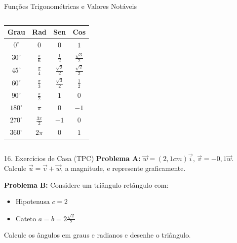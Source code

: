 \documentclass{beamer}
\begin{document}
\begin{frame}{Funções Trigonométricas e Valores Notáveis}
\begin{columns}
		\centering
		\normalsize %
		\renewcommand{\arraystretch}{1.3} %
		\begin{tabular}{|c|c|c|c|}
			\hline
			\textbf{Grau} & \textbf{Rad} & \textbf{Sen} & \textbf{Cos} \\ \hline
			$0^{\circ}$ & $0$ & $0$ & $1$ \\ \hline
			$30^{\circ}$ & $\frac{\pi}{6}$ & $\frac{1}{2}$ & $\frac{\sqrt{3}}{2}$ \\ \hline
			$45^{\circ}$ & $\frac{\pi}{4}$ & $\frac{\sqrt{2}}{2}$ & $\frac{\sqrt{2}}{2}$ \\ \hline
			$60^{\circ}$ & $\frac{\pi}{3}$ & $\frac{\sqrt{3}}{2}$ & $\frac{1}{2}$ \\ \hline
			$90^{\circ}$ & $\frac{\pi}{2}$ & $1$ & $0$ \\ \hline
			$180^{\circ}$ & $\pi$ & $0$ & $-1$ \\ \hline
			$270^{\circ}$ & $\frac{3\pi}{2}$ & $-1$ & $0$ \\ \hline
			$360^{\circ}$ & $2\pi$ & $0$ & $1$ \\ \hline
		\end{tabular}
	\end{columns}
\end{frame}

	
\begin{frame}{16. Exercícios de Casa (TPC)}
	\textbf{Problema A:}
	$\vec{w} = (2,1 cm)\vec{i}$, $\vec{v} = -0,1 \vec{w}$.
	Calcule $\vec{u} = \vec{v} + \vec{w}$, a magnitude, e represente graficamente.
	
	\vspace{0.5cm}
	\textbf{Problema B:}
	Considere um triângulo retângulo com:
	\begin{itemize}
		\item Hipotenusa $c = 2$
		\item Cateto $a = b = 2\frac{\sqrt{2}}{2}$
	\end{itemize}
	Calcule os ângulos em graus e radianos e desenhe o triângulo.
\end{frame}
\end{document}

